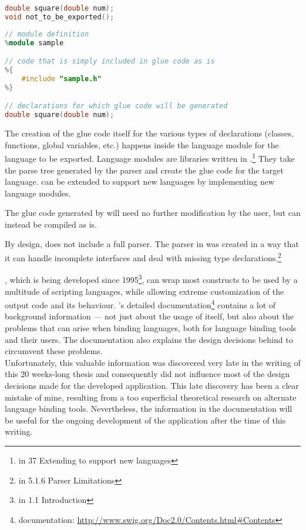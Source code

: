 \SingleSpacing
\begin{lstlisting}[language=C++, caption=Original header file: sample.h]
double square(double num);
void not_to_be_exported();
\end{lstlisting}
\OnehalfSpacing

\SingleSpacing
\begin{lstlisting}[language=C++, caption=According \myProperName{SWIG} interface file]
// module definition
%module sample

// code that is simply included in glue code as is
%{
    #include "sample.h"
%}

// declarations for which glue code will be generated
double square(double num);
\end{lstlisting}
\OnehalfSpacing

The creation of the glue code itself for the various types of declarations (classes, functions, global variables, etc.) happens inside the language module for the language to be exported. Language modules are libraries written in .\footnote{\citep{SWIGHPDoc} in 37 Extending  to support new languages} They take the parse tree generated by the  parser and create the glue code for the target language.  can be extended to support new languages by implementing new language modules.

The glue code generated by  will need no further modification by the user, but can instead be compiled as is.

By design,  does not include a full  parser. The parser in  was created in a way that it can handle incomplete interfaces and deal with missing type declarations.\footnote{\citep{SWIGHPDoc} in 5.1.6 Parser Limitations}

, which is being developed since 1995\footnote{\citep{SWIGHPDoc} in 1.1 Introduction}, can wrap most  constructs to be used by a multitude of scripting languages, while allowing extreme customization of the output code and its behaviour. 's detailed documentation\footnote{ documentation: \url{http://www.swig.org/Doc2.0/Contents.html\#Contents}} contains a lot of background information --- not just about the usage of  itself, but also about the problems that can arise when binding languages, both for language binding tools and their users. The documentation also explains the design decisions behind  to circumvent these problems.
\\Unfortunately, this valuable information was discovered very late in the writing of this 20 weeks-long thesis and consequently did not influence most of the design decisions made for the developed application. This late discovery has been a clear mistake of mine, resulting from a too superficial theoretical research on alternate language binding tools. Nevertheless, the information in the documentation will be useful for the ongoing development of the application after the time of this writing.

